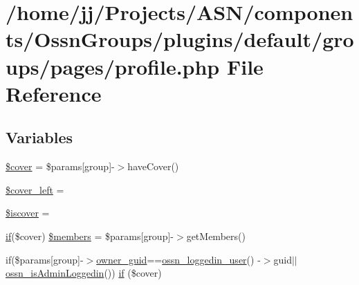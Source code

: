 \hypertarget{_ossn_groups_2plugins_2default_2groups_2pages_2profile_8php}{}\section{/home/jj/\+Projects/\+A\+S\+N/components/\+Ossn\+Groups/plugins/default/groups/pages/profile.php File Reference}
\label{_ossn_groups_2plugins_2default_2groups_2pages_2profile_8php}
\subsection*{Variables}
\begin{DoxyCompactItemize}
\item 
\hyperlink{_ossn_groups_2plugins_2default_2groups_2pages_2profile_8php_a753dd5b85d0d36fb54a13adb92b005f3}{\$cover} = \$params\mbox{[}\textquotesingle{}group\textquotesingle{}\mbox{]}-\/$>$have\+Cover()
\item 
\hyperlink{_ossn_groups_2plugins_2default_2groups_2pages_2profile_8php_a0a8ba950d04c375d81c1be56311ce4de}{\$cover\+\_\+left} = \textquotesingle{}\textquotesingle{}
\item 
\hyperlink{_ossn_groups_2plugins_2default_2groups_2pages_2profile_8php_a3d7d04e2526de7a4e23e0cf138b05fdf}{\$iscover} = \textquotesingle{}\textquotesingle{}
\item 
\hyperlink{jquery_8tokeninput_8js_ad8dd46a3cbc004569e34401e9e71771a}{if}(\$cover) \hyperlink{_ossn_groups_2plugins_2default_2groups_2pages_2profile_8php_a2f710c0f52109e082cc8cdc179d002d4}{\$members} = \$params\mbox{[}\textquotesingle{}group\textquotesingle{}\mbox{]}-\/$>$get\+Members()
\item 
if(\$params\mbox{[}\textquotesingle{}group\textquotesingle{}\mbox{]}-\/$>$\hyperlink{user_8php_a307051fefc937afd02c509c55646f50b}{owner\+\_\+guid}==\hyperlink{ossn_8lib_8users_8php_aa3c8068d0e6638b414d6a2f6c62565b8}{ossn\+\_\+loggedin\+\_\+user}() -\/$>$guid$\vert$$\vert$\hyperlink{ossn_8lib_8users_8php_abf45a4c659ffd196160e8173c2af1106}{ossn\+\_\+is\+Admin\+Loggedin}()) \hyperlink{_ossn_groups_2plugins_2default_2groups_2pages_2profile_8php_a1973cb4de7b19378e96144c69f833e9a}{if} (\$cover)
\item 
$$
\end{DoxyCompactItemize}
